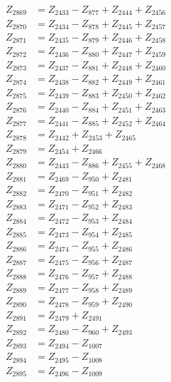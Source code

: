 \begin{multicols}{2}
\begin{align}
Z_{2869} &= Z_{2433} - Z_{877} + Z_{2444} + Z_{2456} \nonumber \\
Z_{2870} &= Z_{2434} - Z_{878} + Z_{2445} + Z_{2457} \nonumber \\
Z_{2871} &= Z_{2435} - Z_{879} + Z_{2446} + Z_{2458} \nonumber \\
Z_{2872} &= Z_{2436} - Z_{880} + Z_{2447} + Z_{2459} \nonumber \\
Z_{2873} &= Z_{2437} - Z_{881} + Z_{2448} + Z_{2460} \nonumber \\
Z_{2874} &= Z_{2438} - Z_{882} + Z_{2449} + Z_{2461} \nonumber \\
Z_{2875} &= Z_{2439} - Z_{883} + Z_{2450} + Z_{2462} \nonumber \\
Z_{2876} &= Z_{2440} - Z_{884} + Z_{2451} + Z_{2463} \nonumber \\
Z_{2877} &= Z_{2441} - Z_{885} + Z_{2452} + Z_{2464} \nonumber \\
Z_{2878} &= Z_{2442} + Z_{2453} + Z_{2465} \nonumber \\
Z_{2879} &= Z_{2454} + Z_{2466} \nonumber \\
Z_{2880} &= Z_{2443} - Z_{886} + Z_{2455} + Z_{2468} \nonumber \\
Z_{2881} &= Z_{2469} - Z_{950} + Z_{2481} \nonumber \\
Z_{2882} &= Z_{2470} - Z_{951} + Z_{2482} \nonumber \\
Z_{2883} &= Z_{2471} - Z_{952} + Z_{2483} \nonumber \\
Z_{2884} &= Z_{2472} - Z_{953} + Z_{2484} \nonumber \\
Z_{2885} &= Z_{2473} - Z_{954} + Z_{2485} \nonumber \\
Z_{2886} &= Z_{2474} - Z_{955} + Z_{2486} \nonumber \\
Z_{2887} &= Z_{2475} - Z_{956} + Z_{2487} \nonumber \\
Z_{2888} &= Z_{2476} - Z_{957} + Z_{2488} \nonumber \\
Z_{2889} &= Z_{2477} - Z_{958} + Z_{2489} \nonumber \\
Z_{2890} &= Z_{2478} - Z_{959} + Z_{2490} \nonumber \\
Z_{2891} &= Z_{2479} + Z_{2491} \nonumber \\
Z_{2892} &= Z_{2480} - Z_{960} + Z_{2493} \nonumber \\
Z_{2893} &= Z_{2494} - Z_{1007} \nonumber \\
Z_{2894} &= Z_{2495} - Z_{1008} \nonumber \\
Z_{2895} &= Z_{2496} - Z_{1009} \nonumber \\

\end{align}
\end{multicols}

